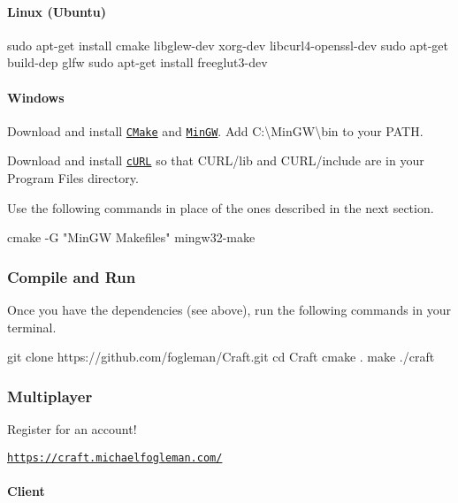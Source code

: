 \paragraph*{Linux (Ubuntu)}

\begin{DoxyVerb}sudo apt-get install cmake libglew-dev xorg-dev libcurl4-openssl-dev
sudo apt-get build-dep glfw
sudo apt-get install freeglut3-dev
\end{DoxyVerb}


\paragraph*{Windows}

Download and install \href{http://www.cmake.org/cmake/resources/software.html}{\tt C\+Make} and \href{http://www.mingw.org/}{\tt Min\+GW}. Add {\ttfamily C\+:\textbackslash{}Min\+GW\textbackslash{}bin} to your {\ttfamily P\+A\+TH}.

Download and install \href{http://curl.haxx.se/download.html}{\tt c\+U\+RL} so that C\+U\+R\+L/lib and C\+U\+R\+L/include are in your Program Files directory.

Use the following commands in place of the ones described in the next section. \begin{DoxyVerb}cmake -G "MinGW Makefiles"
mingw32-make
\end{DoxyVerb}


\subsubsection*{Compile and Run}

Once you have the dependencies (see above), run the following commands in your terminal. \begin{DoxyVerb}git clone https://github.com/fogleman/Craft.git
cd Craft
cmake .
make
./craft
\end{DoxyVerb}


\subsubsection*{Multiplayer}

Register for an account!

\href{https://craft.michaelfogleman.com/}{\tt https\+://craft.\+michaelfogleman.\+com/}

\paragraph*{Client}

